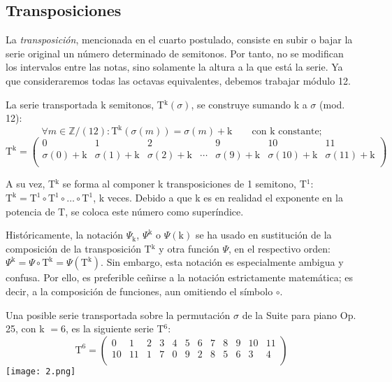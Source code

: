 	\subsection{Transposiciones}
		La \emph{transposición}, mencionada en el cuarto postulado, consiste en subir o bajar la serie original un número determinado de semitonos. Por tanto, no se modifican los intervalos entre las notas, sino solamente la altura a la que está la serie. Ya que consideraremos todas las octavas equivalentes, debemos trabajar módulo 12. 
		
		La serie transportada k semitonos, T$^\text{k}\left(\sigma\right)$, se construye sumando k a $\sigma$ (mod. 12):
		$$
		\forall m\in \mathbb{Z} / (12):	\text{T}^\text{k}\left(\sigma\left(m\right)\right)=\sigma\left(m\right)+\text{k} \qquad \text{con k constante;}
		$$		
		$$
		\text{T}^\text{k}=\left(\begin{matrix}0&1&2&&9&10&11\\\sigma\left(0\right)+\text{k}&\sigma\left(1\right)+\text{k}&\sigma\left(2\right)+\text{k}&\cdots&\sigma\left(9\right)+\text{k}&\sigma\left(10\right)+\text{k}&\sigma\left(11\right)+\text{k}\\\end{matrix}\right)
		$$
		
		A su vez, T$^\text{k}$ se forma al componer k transposiciones de 1 semitono, T$^1$: $\text{T}^\text{k}=\text{T}^1\circ\text{T}^1\circ\ldots\circ\text{T}^1$, k veces. Debido a que k es en realidad el exponente en la potencia de T, se coloca este número como superíndice.
		
		Históricamente, la notación $\Psi_\text{k}$, $\Psi^\text{k}$ o $\Psi(\text{k})$ se ha usado en sustitución de la composición de la transposición T$^\text{k}$ y otra función $\Psi$, en el respectivo orden: $\Psi^\text{k}=\Psi \circ \text{T}^\text{k} = \Psi(\text{T}^\text{k})$. Sin embargo, esta notación es especialmente ambigua y confusa. Por ello, es preferible ceñirse a la notación estrictamente matemática; es decir, a la composición de funciones, aun omitiendo el símbolo $\circ$.
		
		Una posible serie transportada sobre la permutación $\sigma$ de la Suite para piano Op. 25, con k $= 6$, es la siguiente serie T$^6$:
		$$\text{T}^6=\left(\begin{matrix}0&1&2&3&4&5&6&7&8&9&10&11\\10&11&1&7&0&9&2&8&5&6&3&4\\\end{matrix}\right)$$	
		\texttt{[image: 2.png]}
		
